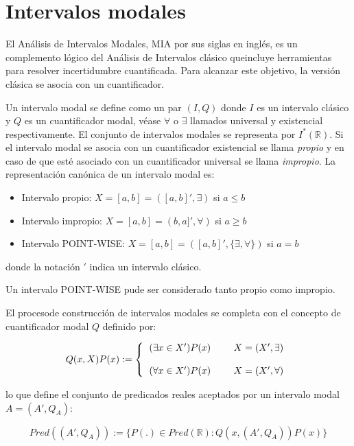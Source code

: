 \section{Intervalos modales}

El Análisis de Intervalos Modales, MIA por sus siglas en inglés, es un complemento lógico del Análisis de Intervalos clásico queincluye herramientas para resolver incertidumbre cuantificada. Para alcanzar este objetivo, la versión clásica se asocia con un cuantificador.
\par Un intervalo modal se define como un par $(I,Q)$ donde $I$ es un intervalo clásico y $Q$ es un cuantificador modal, véase $\forall$ o $\exists$ llamados universal y existencial respectivamente. El conjunto de intervalos modales se representa por $I^*(\mathbb{R})$. Si el intervalo modal se asocia con un cuantificador existencial se llama{ \em propio} y en caso de que esté asociado con un cuantificador universal se llama{ \em impropio}. La representación canónica de un intervalo modal es:

\begin{itemize}
	\item Intervalo propio: $X = [a,b] = ([a,b]',\exists)$ si $a \leq b$
	\item Intervalo impropio: $X = [a,b] = (b,a]',\forall)$ si $a \geq b$
	\item Intervalo POINT-WISE: $X = [a,b] = ([a,b]',\{ \exists, \forall \})$ si $a = b$
\end{itemize}

donde la notación $'$ indica un intervalo clásico.
\par Un intervalo POINT-WISE pude ser considerado tanto propio como impropio.
\par El procesode construcción de intervalos modales se completa con el concepto de cuantificador modal $Q$ definido por:

\begin{equation}
Q(x,X)P(x) := \left\{ \begin{tabular}{l l l}
$(\exists x \in X')P(x)$ & & $X = (X', \exists)$ \\
& & \\
$(\forall x \in X')P(x)$ & & $X = (X', \forall)$
\end{tabular}
\right.
\nonumber
\end{equation}

lo que define el conjunto de predicados reales aceptados por un intervalo modal $A = (A',Q_A)$:

\begin{equation}
Pred((A',Q_A)) := \{ P(.) \in Pred(\mathbb{R}) : Q(x,(A',Q_A))P(x) \}
\nonumber
\end{equation}

